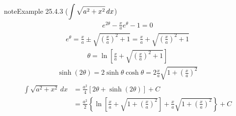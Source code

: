 \documentclass[letterpaper,10pt,italian]{jupyterBook}
\begin{document}
\begin{sphinxadmonition}{note}{Example 25.4.3 (\protect\( \displaystyle \int \sqrt{a^2 + x^2} \,  dx\protect\))}
\begin{equation*}
\end{equation*}\begin{equation*}
\begin{split}e^{2 \theta} - \frac{x}{a} e^{\theta} - 1 = 0\end{split}
\end{equation*}\begin{equation*}
\begin{split}e^{\theta} 
  = \frac{x}{a} \pm \sqrt{\left( \frac{x}{a} \right)^2 + 1}
  = \frac{x}{a}  +  \sqrt{\left( \frac{x}{a} \right)^2 + 1}
\end{split}
\end{equation*}\begin{equation*}
\begin{split}\theta = \ln \left[ \frac{x}{a}  +  \sqrt{\left( \frac{x}{a} \right)^2 + 1} \right]\end{split}
\end{equation*}\begin{equation*}
\begin{split}\sinh (2 \theta) = 2 \sinh \theta \cosh \theta = 2 \frac{x}{a} \sqrt{1 + \left(\frac{x}{a}\right)^2}\end{split}
\end{equation*}\begin{equation*}
\begin{split}\begin{aligned}
  \int \sqrt{a^2 + x^2} \, dx
   & = \frac{a^2}{4} \left[ 2 \theta + \sinh \left( 2 \theta \right) \right] + C \\
   & = \frac{a^2}{2} \left\{ \ln \left[ \frac{x}{a}  +  \sqrt{1 + \left( \frac{x}{a} \right)^2} \right] + \frac{x}{a} \sqrt{1 + \left(\frac{x}{a}\right)^2} \right\} + C
\end{aligned}\end{split}
\end{equation*}\end{sphinxadmonition}
\label{ch/infinitesimal_calculus/integrals:example-9}
\end{document}
